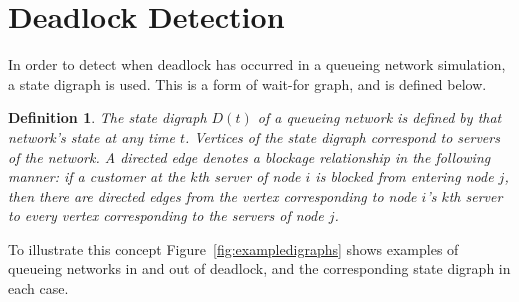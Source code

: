 \documentclass{article}
\newtheorem{definition}{Definition}
\numberwithin{equation}{section}
\begin{document}
\section{Deadlock Detection}\label{sec:detectingdeadlock}

In order to detect when deadlock has occurred in a queueing network simulation, a state digraph is used.
This is a form of wait-for graph, and is defined below.


\begin{definition}
The state digraph $D(t)$ of a queueing network is defined by that network's state at any time $t$.
Vertices of the state digraph correspond to servers of the network.
A directed edge denotes a blockage relationship in the following manner: if a customer at the $k$th server of node $i$ is blocked from entering node $j$, then there are directed edges from the vertex corresponding to node $i$'s $k$th server to every vertex corresponding to the servers of node $j$.
\end{definition}

To illustrate this concept Figure~\ref{fig:exampledigraphs} shows examples of queueing networks in and out of deadlock, and the corresponding state digraph in each case.
\end{document}
